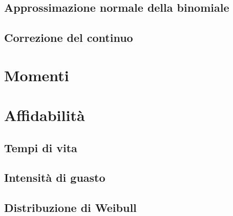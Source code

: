         \subsection{Approssimazione normale della binomiale}
        \subsection*{Correzione del continuo}
    \section{Momenti}
    \section{Affidabilità}
        \subsection{Tempi di vita}
        \subsection{Intensità di guasto}
        \subsection{Distribuzione di Weibull}
